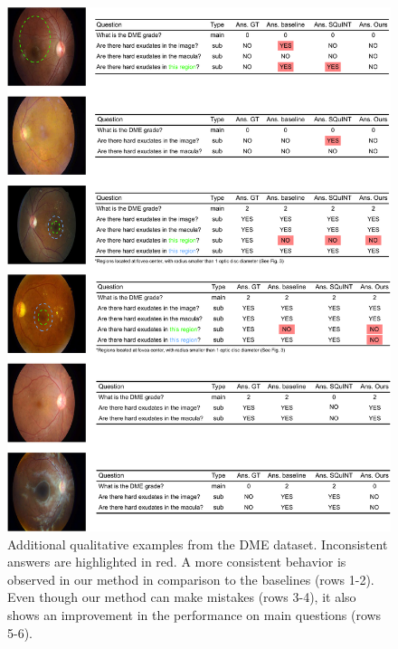 \begin{figure}[!t]
\begin{center}
\includegraphics[width=\textwidth]{Figures/Part2_Consist/01_mainsub/examples_supplementary_ext.pdf}
\caption{Additional qualitative examples from the DME dataset. Inconsistent answers are highlighted in red. A more consistent behavior is observed in our method in comparison to the baselines (rows 1-2). Even though our method can make mistakes (rows 3-4), it also shows an improvement in the performance on main questions (rows 5-6).}
\label{fig:supp_examples}
\end{center}
\end{figure}